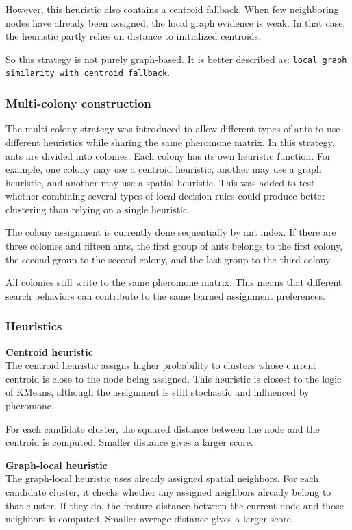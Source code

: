 \documentclass[11pt]{article}
\begin{document}
However, this heuristic also contains a centroid fallback. When few neighboring nodes have already been assigned, the local graph evidence is weak. In that case, the heuristic partly relies on distance to initialized centroids.

So this strategy is not purely graph-based. It is better described as: \texttt{local graph similarity with centroid fallback}.


\subsubsection{Multi-colony construction}
The multi-colony strategy was introduced to allow different types of ants to use different heuristics while sharing the same pheromone matrix. In this strategy, ants are divided into colonies. Each colony has its own heuristic function. For example, one colony may use a centroid heuristic, another may use a graph heuristic, and another may use a spatial heuristic. This was added to test whether combining several types of local decision rules could produce better clustering than relying on a single heuristic.

The colony assignment is currently done sequentially by ant index. If there are three colonies and fifteen ants, the first group of ants belongs to the first colony, the second group to the second colony, and the last group to the third colony.

All colonies still write to the same pheromone matrix. This means that different search behaviors can contribute to the same learned assignment preferences.



\subsubsection{Heuristics}

\textbf{Centroid heuristic} \\
The centroid heuristic assigns higher probability to clusters whose current centroid is close to the node being assigned. This heuristic is closest to the logic of KMeans, although the assignment is still stochastic and influenced by pheromone.

For each candidate cluster, the squared distance between the node and the centroid is computed. Smaller distance gives a larger score.


\textbf{Graph-local heuristic} \\
The graph-local heuristic uses already assigned spatial neighbors. For each candidate cluster, it checks whether any assigned neighbors already belong to that cluster. If they do, the feature distance between the current node and those neighbors is computed. Smaller average distance gives a larger score.
\end{document}
